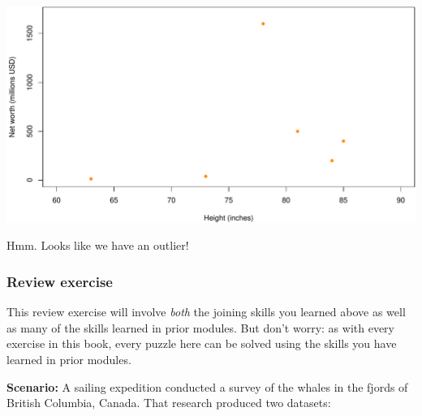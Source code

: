 \documentclass[
]{book}
\begin{document}
\includegraphics{figures/unnamed-chunk-270-1.pdf}

Hmm. Looks like we have an outlier!

\hypertarget{review-exercise-4}{%
\subsubsection*{Review exercise}\label{review-exercise-4}}

This review exercise will involve \emph{both} the joining skills you learned above as well as many of the skills learned in prior modules. But don't worry: as with every exercise in this book, every puzzle here can be solved using the skills you have learned in prior modules.

\textbf{Scenario:} A sailing expedition conducted a survey of the whales in the fjords of British Columbia, Canada. That research produced two datasets:
\end{document}
